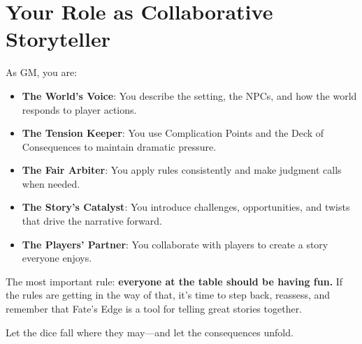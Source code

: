 \section*{Your Role as Collaborative Storyteller}

As GM, you are:
\begin{itemize}
    \item \textbf{The World's Voice}: You describe the setting, the NPCs, and how the world responds to player actions.
    \item \textbf{The Tension Keeper}: You use Complication Points and the Deck of Consequences to maintain dramatic pressure.
    \item \textbf{The Fair Arbiter}: You apply rules consistently and make judgment calls when needed.
    \item \textbf{The Story's Catalyst}: You introduce challenges, opportunities, and twists that drive the narrative forward.
    \item \textbf{The Players' Partner}: You collaborate with players to create a story everyone enjoys.
\end{itemize}

The most important rule: \textbf{everyone at the table should be having fun.} If the rules are getting in the way of that, it's time to step back, reassess, and remember that Fate's Edge is a tool for telling great stories together.

Let the dice fall where they may---and let the consequences unfold.

